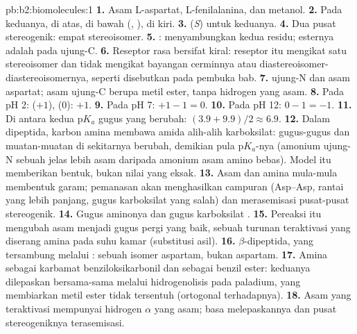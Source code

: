 \begin{solution}{pb:b2:biomolecules:1}
\textbf{1.} Asam L-aspartat, L-fenilalanina, dan metanol.
\textbf{2.} Pada keduanya,  di atas,  di bawah (, ), 
di kiri.
\textbf{3.} (\textit{S}) untuk keduanya.
\textbf{4.} Dua pusat stereogenik: empat stereoisomer.
\textbf{5.} : 
menyambungkan kedua residu; esternya adalah  pada ujung-C.
\textbf{6.} Reseptor rasa bersifat kiral: reseptor itu mengikat satu
stereoisomer dan tidak mengikat bayangan cerminnya atau
diastereoisomer-diastereoisomernya, seperti disebutkan pada pembuka bab.
\textbf{7.}  ujung-N dan   asam aspartat;
asam ujung-C berupa metil ester, tanpa hidrogen yang asam.
\textbf{8.} Pada pH 2:  ($+1$),   (0): $+1$.
\textbf{9.} Pada pH 7: $+1 - 1 = 0$.
\textbf{10.} Pada pH 12: $0 - 1 = -1$.
\textbf{11.} Di antara kedua $\mathrm pK_a$ gugus yang berubah: $(3.9 + 9.9)/2 \approx 6.9$.
\textbf{12.} Dalam dipeptida, karbon amina membawa amida alih-alih
karboksilat: gugus-gugus dan muatan-muatan di sekitarnya berubah, demikian
pula $\mathrm pK_a$-nya (amonium ujung-N sebuah  jelas lebih asam
daripada amonium asam amino bebas). Model itu memberikan bentuk, bukan nilai
yang eksak.
\textbf{13.} Asam dan amina mula-mula membentuk garam; pemanasan akan
menghasilkan campuran (Asp--Asp, rantai yang lebih panjang, gugus
karboksilat yang salah) dan merasemisasi pusat-pusat stereogenik.
\textbf{14.} Gugus aminonya dan gugus karboksilat .
\textbf{15.} Pereaksi itu mengubah  asam menjadi gugus pergi yang
baik, sebuah turunan teraktivasi yang diserang amina pada suhu kamar
(substitusi asil).
\textbf{16.} $\beta$-dipeptida, yang tersambung melalui :
sebuah isomer aspartam, bukan aspartam.
\textbf{17.} Amina sebagai karbamat benziloksikarbonil dan 
sebagai benzil ester: keduanya dilepaskan bersama-sama melalui
hidrogenolisis pada paladium, yang membiarkan metil ester tidak tersentuh
(ortogonal terhadapnya).
\textbf{18.} Asam yang teraktivasi mempunyai hidrogen $\alpha$ yang asam;
basa melepaskannya dan pusat stereogeniknya terasemisasi.

\end{solution}
